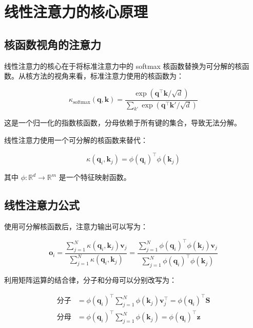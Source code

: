 \chapter{线性注意力的核心原理}

\section{核函数视角的注意力}

线性注意力的核心在于将标准注意力中的 softmax 核函数替换为可分解的核函数。从核方法的视角来看，标准注意力使用的核函数为：

\begin{equation}
    \kappa_{\text{softmax}}(\mathbf{q}, \mathbf{k}) = \frac{\exp(\mathbf{q}^\top \mathbf{k} / \sqrt{d})}{\sum_{k'} \exp(\mathbf{q}^\top \mathbf{k}' / \sqrt{d})}
\end{equation}

这是一个归一化的指数核函数，分母依赖于所有键的集合，导致无法分解。

线性注意力使用一个可分解的核函数来替代：

\begin{equation}
    \kappa(\mathbf{q}_i, \mathbf{k}_j) = \phi(\mathbf{q}_i)^\top \phi(\mathbf{k}_j)
\end{equation}

其中 $\phi: \mathbb{R}^d \rightarrow \mathbb{R}^m$ 是一个特征映射函数。

\section{线性注意力公式}

使用可分解核函数后，注意力输出可以写为：

\begin{equation}
    \mathbf{o}_i = \frac{\sum_{j=1}^N \kappa(\mathbf{q}_i, \mathbf{k}_j) \mathbf{v}_j}{\sum_{j=1}^N \kappa(\mathbf{q}_i, \mathbf{k}_j)} = \frac{\sum_{j=1}^N \phi(\mathbf{q}_i)^\top \phi(\mathbf{k}_j) \mathbf{v}_j}{\sum_{j=1}^N \phi(\mathbf{q}_i)^\top \phi(\mathbf{k}_j)}
\end{equation}

利用矩阵运算的结合律，分子和分母可以分别改写为：

\begin{align}
    \text{分子} &= \phi(\mathbf{q}_i)^\top \sum_{j=1}^N \phi(\mathbf{k}_j) \mathbf{v}_j^\top = \phi(\mathbf{q}_i)^\top \mathbf{S} \\
    \text{分母} &= \phi(\mathbf{q}_i)^\top \sum_{j=1}^N \phi(\mathbf{k}_j) = \phi(\mathbf{q}_i)^\top \mathbf{z}
\end{align}

